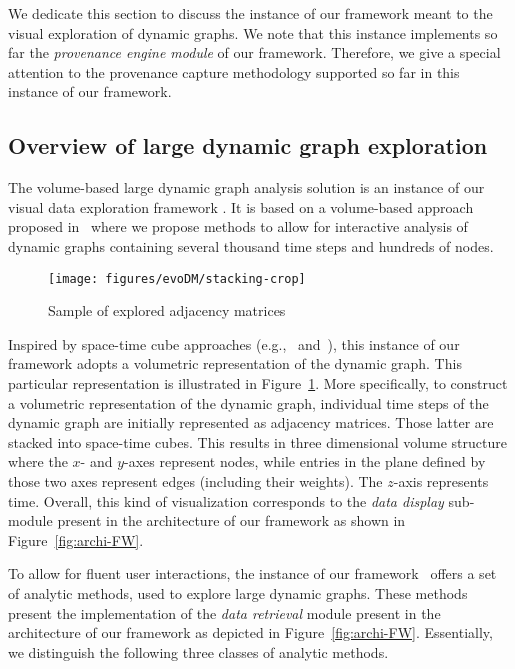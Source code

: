 


{\color{Fuchsia}We dedicate this section to discuss the instance of our framework \framework{} meant to the visual exploration of dynamic graphs. 
We note that this instance implements so far the \emph{provenance engine module} of our framework.
Therefore, we give a special attention to the provenance capture methodology supported so far in this instance of our framework. }



\subsection{Overview of large dynamic graph exploration}\label{A02:overview}
The volume-based large dynamic graph analysis solution is an instance of our visual data exploration framework \framework{}.
It is based on a volume-based approach proposed in~\cite{Bruder2019} where we propose methods to allow for interactive analysis of dynamic graphs containing several thousand time steps and hundreds of nodes.
	
\begin{figure}[b]
	\centering
	\texttt{[image: figures/evoDM/stacking-crop]}
	\caption{Sample of explored adjacency matrices~\cite{Bruder2019}}
	\label{fig:illu}
\end{figure}

Inspired by space-time cube approaches (e.g.,~\cite{bach:2017} and~\cite{Bach_CHI:14}), this instance of our framework adopts a volumetric representation of the dynamic graph.
This particular representation is illustrated in Figure~\ref{fig:illu}.
More specifically, to construct a volumetric representation of the dynamic graph, individual time steps of the dynamic graph are initially represented as adjacency matrices.
Those latter are stacked into space-time cubes.
This results in three dimensional volume structure where the $x$- and $y$-axes represent nodes, while entries in the plane defined by those two axes represent edges (including their weights). 
The $z$-axis represents time.
{\color{Fuchsia}Overall, this kind of visualization corresponds to the \emph{data display} sub-module present in the architecture of our framework as shown in Figure~\ref{fig:archi-FW}.}



To allow for fluent user interactions, the instance of our framework~\cite{Bruder2019} offers a set of analytic methods, used to explore large dynamic graphs. {\color{Fuchsia}These methods present the implementation of the \emph{data retrieval} module present in the architecture of our framework as depicted in Figure~\ref{fig:archi-FW}.}
Essentially, we distinguish the following three classes of analytic methods.

